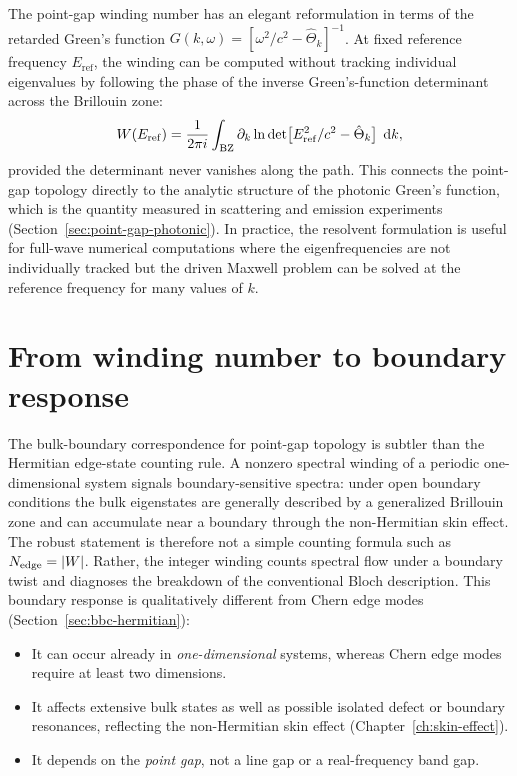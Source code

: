 The point-gap winding number has an elegant reformulation in terms of
the retarded Green's function
$G(k,\omega) = [\omega^2/c^2 - \hat{\Theta}_k]^{-1}$.
At fixed reference frequency $E_{\mathrm{ref}}$, the winding can be
computed without tracking individual eigenvalues by following the phase
of the inverse Green's-function determinant across the Brillouin zone:
\begin{equation}
 W(E_{\mathrm{ref}}) =
 \frac{1}{2\pi i}\int_{\mathrm{BZ}}
 \partial_k
 \ln\det\bigl[E_{\mathrm{ref}}^2/c^2 - \hat{\Theta}_k\bigr]\;\mathop{}\!\mathrm{d} k,
 \label{eq:green-winding}
\end{equation}
provided the determinant never vanishes along the path. This connects
the point-gap topology directly to the analytic structure of the
photonic Green's function, which is the quantity measured in scattering
and emission experiments (Section~\ref{sec:point-gap-photonic}). In
practice, the resolvent formulation is useful for full-wave numerical
computations where the eigenfrequencies are not individually tracked but
the driven Maxwell problem can be solved at the reference frequency for
many values of $k$.


\section{From winding number to boundary response}
\label{sec:winding-to-edge}

The bulk-boundary correspondence for point-gap topology is subtler than
the Hermitian edge-state counting rule. A nonzero spectral winding of a
periodic one-dimensional system signals boundary-sensitive spectra:
under open boundary conditions the bulk eigenstates are generally
described by a generalized Brillouin zone and can accumulate near a
boundary through the non-Hermitian skin effect. The robust statement is
therefore not a simple counting formula such as
$N_{\mathrm{edge}}=|W|$. Rather, the integer winding counts spectral
flow under a boundary twist and diagnoses the breakdown of the
conventional Bloch description.
This boundary response is qualitatively different from Chern edge modes
(Section~\ref{sec:bbc-hermitian}):
\begin{itemize}
 \item It can occur already in \emph{one-dimensional} systems, whereas
 Chern edge modes require at least two dimensions.
 \item It affects extensive bulk states as well as possible isolated
 defect or boundary resonances, reflecting the non-Hermitian skin
 effect (Chapter~\ref{ch:skin-effect}).
 \item It depends on the \emph{point gap}, not a line gap or a
 real-frequency band gap.
\end{itemize}


